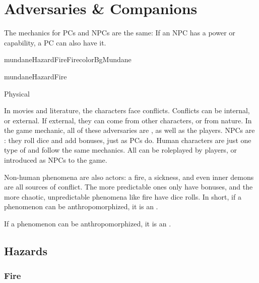 \chapterspaceabove{6.75cm}
\chapterspacebelow{11.25cm}


\chapter{Adversaries \& Companions}

\begin{emphasisParagraph}
	The mechanics for PCs and NPCs are the same: If an NPC has a power or capability,
	a PC can also have it.
\end{emphasisParagraph}

\begin{actorCardMiniEuro}{mundaneHazardFire}{Fire}{colorBgMundane}
	\begin{capabilitiesBox}{mundaneHazardFire}
		\begin{capabilitiesTable}{Physical}
		\end{capabilitiesTable}
	\end{capabilitiesBox}
\end{actorCardMiniEuro}


In movies and literature, the characters face conflicts.
Conflicts can be internal, or external.
If external, they can come from other characters, or from nature.
In the game mechanic, all of these adversaries are , as well as the players.
NPCs are : they roll dice and add bonuses, just as PCs do.
Human characters are just one type of  and follow the same mechanics.
All  can be roleplayed by players, or introduced as NPCs to the game.

Non-human phenomena are also actors: a fire, a sickness, and even inner demons are all
sources of conflict. The more predictable ones only have bonuses, and the more
chaotic, unpredictable phenomena like fire have dice rolls.
In short, if a phenomenon can be anthropomorphized, it is an .

\begin{emphasisParagraph}
	If a phenomenon can be anthropomorphized, it is an .
\end{emphasisParagraph}



\section{Hazards}

\subsection{Fire}

